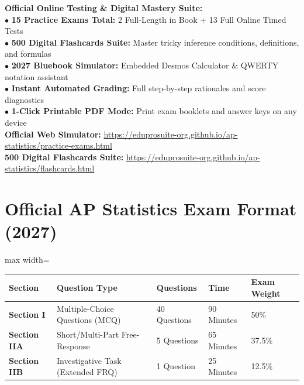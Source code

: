 \begin{center}
\begin{tcolorbox}[standard jigsaw,width=0.95\linewidth,colback=NavyBlue!5!white,colframe=NavyBlue,title=\textbf{FREE DIGITAL COMPANION: 13 ONLINE EXAMS + 500 FLASHCARDS}]
\begin{minipage}{0.95\linewidth}
  \textbf{Official Online Testing \& Digital Mastery Suite:}\\
  $\bullet$ \textbf{15 Practice Exams Total:} 2 Full-Length in Book + 13 Full Online Timed Tests\\
  $\bullet$ \textbf{500 Digital Flashcards Suite:} Master tricky inference conditions, definitions, and formulas\\
  $\bullet$ \textbf{2027 Bluebook Simulator:} Embedded Desmos Calculator \& QWERTY notation assistant\\
  $\bullet$ \textbf{Instant Automated Grading:} Full step-by-step rationales and score diagnostics\\
  $\bullet$ \textbf{1-Click Printable PDF Mode:} Print exam booklets and answer keys on any device\\[6pt]
  \textbf{Official Web Simulator:} \url{https://eduprosuite-org.github.io/ap-statistics/practice-exams.html}\\
  \textbf{500 Digital Flashcards Suite:} \url{https://eduprosuite-org.github.io/ap-statistics/flashcards.html}
\end{minipage}
\end{tcolorbox}
\end{center}

\section*{Official AP Statistics Exam Format (2027)}
\begin{adjustbox}{max width=\linewidth}
\begin{tabular}{lllll}
\toprule
\textbf{Section} & \textbf{Question Type} & \textbf{Questions} & \textbf{Time} & \textbf{Exam Weight} \\
\midrule
\textbf{Section I} & Multiple-Choice Questions (MCQ) & 40 Questions & 90 Minutes & 50\% \\
\textbf{Section IIA} & Short/Multi-Part Free-Response & 5 Questions & 65 Minutes & 37.5\% \\
\textbf{Section IIB} & Investigative Task (Extended FRQ) & 1 Question & 25 Minutes & 12.5\% \\
\bottomrule
\end{tabular}
\end{adjustbox}


